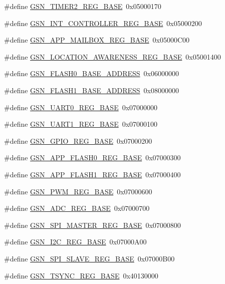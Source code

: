 \begin{DoxyCompactItemize}
\item 
\#define \hyperlink{a00546_a882acc1ea8af7716a2d89b8e0a315827}{GSN\_\-TIMER2\_\-REG\_\-BASE}~0x05000170
\item 
\#define \hyperlink{a00546_a7ef63e25b2923428a8540d2ba731001f}{GSN\_\-INT\_\-CONTROLLER\_\-REG\_\-BASE}~0x05000200
\item 
\#define \hyperlink{a00546_ab958988d29e783cfca77d69ca8046f3a}{GSN\_\-APP\_\-MAILBOX\_\-REG\_\-BASE}~0x05000C00
\item 
\#define \hyperlink{a00546_ac76b8c53c454720941c9ddd67a94781f}{GSN\_\-LOCATION\_\-AWARENESS\_\-REG\_\-BASE}~0x05001400
\item 
\#define \hyperlink{a00546_ac1960d07567f36bd8684c878bdcbb907}{GSN\_\-FLASH0\_\-BASE\_\-ADDRESS}~0x06000000
\item 
\#define \hyperlink{a00546_a37abc3905a828f28c8c3ca1e103b8d5d}{GSN\_\-FLASH1\_\-BASE\_\-ADDRESS}~0x08000000
\item 
\#define \hyperlink{a00546_ad2a4666b8d4948fa11e988fccf0d88f7}{GSN\_\-UART0\_\-REG\_\-BASE}~0x07000000
\item 
\#define \hyperlink{a00546_a561c2e1172058dd7aa531ae977dec5fd}{GSN\_\-UART1\_\-REG\_\-BASE}~0x07000100
\item 
\#define \hyperlink{a00546_aa0d6278b3da0def98aa3fe50f8b5d436}{GSN\_\-GPIO\_\-REG\_\-BASE}~0x07000200
\item 
\#define \hyperlink{a00546_a0f620d9d7c3379e2b748378f0931e623}{GSN\_\-APP\_\-FLASH0\_\-REG\_\-BASE}~0x07000300
\item 
\#define \hyperlink{a00546_aabc1da33628508df4a6e855b76be987a}{GSN\_\-APP\_\-FLASH1\_\-REG\_\-BASE}~0x07000400
\item 
\#define \hyperlink{a00546_a08f787e4b0edaa847ceee7c286cf27e3}{GSN\_\-PWM\_\-REG\_\-BASE}~0x07000600
\item 
\#define \hyperlink{a00546_a255cbdf01f6009c0b1e4ed28b0baef13}{GSN\_\-ADC\_\-REG\_\-BASE}~0x07000700
\item 
\#define \hyperlink{a00546_a853b14921c33d8d8892d2b84bc5feb71}{GSN\_\-SPI\_\-MASTER\_\-REG\_\-BASE}~0x07000800
\item 
\#define \hyperlink{a00546_ad30eba94a4b22f73aaf2c4629d0aa33d}{GSN\_\-I2C\_\-REG\_\-BASE}~0x07000A00
\item 
\#define \hyperlink{a00546_af542e14280562eb53e8b3dbab83b4b1a}{GSN\_\-SPI\_\-SLAVE\_\-REG\_\-BASE}~0x07000B00
\item 
\#define \hyperlink{a00546_a8adfa68c5dd5e1733c1da51e8475009d}{GSN\_\-TSYNC\_\-REG\_\-BASE}~0x40130000

\end{DoxyCompactItemize}
